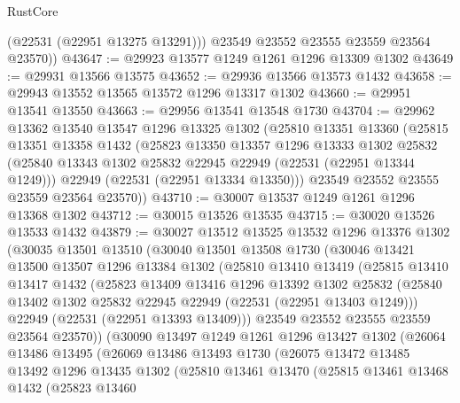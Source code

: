 \begin{lexlean}{RustCore}
\begin{coremodule}
          (@22531 (@22951 @13275 @13291)))
        @23549
        @23552
        @23555
        @23559
        @23564
        @23570))
@43647 := @29923 @13577 @1249 @1261 @1296 @13309 @1302
@43649 := @29931 @13566 @13575
@43652 := @29936 @13566 @13573 @1432
@43658 := @29943 @13552 @13565 @13572 @1296 @13317 @1302
@43660 := @29951 @13541 @13550
@43663 := @29956 @13541 @13548 @1730
@43704 := @29962
    @13362
    @13540
    @13547
    @1296
    @13325
    @1302
    (@25810
      @13351
      @13360
      (@25815
        @13351
        @13358
        @1432
        (@25823
          @13350
          @13357
          @1296
          @13333
          @1302
          @25832
          (@25840 @13343 @1302 @25832 @22945 @22949 (@22531 (@22951 @13344 @1249)))
          @22949
          (@22531 (@22951 @13334 @13350)))
        @23549
        @23552
        @23555
        @23559
        @23564
        @23570))
@43710 := @30007 @13537 @1249 @1261 @1296 @13368 @1302
@43712 := @30015 @13526 @13535
@43715 := @30020 @13526 @13533 @1432
@43879 := @30027
    @13512
    @13525
    @13532
    @1296
    @13376
    @1302
    (@30035
      @13501
      @13510
      (@30040
        @13501
        @13508
        @1730
        (@30046
          @13421
          @13500
          @13507
          @1296
          @13384
          @1302
          (@25810
            @13410
            @13419
            (@25815
              @13410
              @13417
              @1432
              (@25823
                @13409
                @13416
                @1296
                @13392
                @1302
                @25832
                (@25840 @13402 @1302 @25832 @22945 @22949 (@22531 (@22951 @13403 @1249)))
                @22949
                (@22531 (@22951 @13393 @13409)))
              @23549
              @23552
              @23555
              @23559
              @23564
              @23570))
          (@30090
            @13497
            @1249
            @1261
            @1296
            @13427
            @1302
            (@26064
              @13486
              @13495
              (@26069
                @13486
                @13493
                @1730
                (@26075
                  @13472
                  @13485
                  @13492
                  @1296
                  @13435
                  @1302
                  (@25810
                    @13461
                    @13470
                    (@25815
                      @13461
                      @13468
                      @1432
                      (@25823
                        @13460

\end{coremodule}
\end{lexlean}

